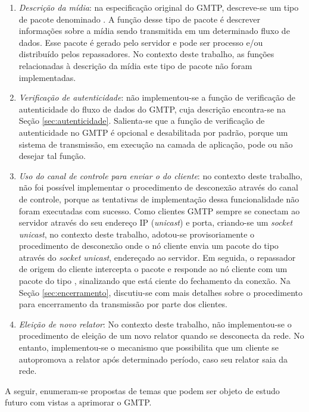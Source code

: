 \begin{enumerate}
\item \textit{Descrição da mídia}: na especificação original do GMTP, descreve-se um tipo de pacote denominado . A função desse tipo de pacote é descrever informações sobre a mídia sendo transmitida em um determinado fluxo de dados. Esse pacote é gerado pelo servidor e pode ser processo e/ou distribuído pelos repassadores.
No contexto deste trabalho, as funções relacionadas à descrição da mídia este tipo de pacote não foram implementadas. 

\item \textit{Verificação de autenticidade}: 
não implementou-se a função de verificação de autenticidade do fluxo de dados do GMTP, cuja descrição encontra-se na Seção \ref{sec:autenticidade}. 
Salienta-se que a função de verificação de autenticidade no GMTP é opcional e desabilitada por padrão, porque um sistema de transmissão, em execução na camada de aplicação, pode ou não desejar tal função.

\item \textit{Uso do canal de controle para enviar o  do cliente}:
no contexto deste trabalho, não foi possível implementar o procedimento de desconexão através do canal de controle, porque as tentativas de implementação dessa funcionalidade não foram executadas com sucesso.
Como clientes GMTP sempre se conectam ao servidor através do seu endereço IP (\textit{unicast}) e porta, criando-se um \textit{socket unicast}, no contexto deste trabalho, adotou-se provisoriamente o procedimento de desconexão onde o nó cliente envia um pacote do tipo  através do \textit{socket unicast}, endereçado ao servidor. Em seguida, o repassador de origem do cliente intercepta o pacote e responde ao nó cliente com um pacote do tipo , sinalizando que está ciente do fechamento da conexão.
Na Seção \ref{sec:encerramento}, discutiu-se com mais detalhes sobre o procedimento para encerramento da transmissão por parte dos clientes.

\item \textit{Eleição de novo relator}:
No contexto deste trabalho, não implementou-se o procedimento de eleição de um novo relator quando se desconecta da rede. No entanto, implementou-se o mecanismo que possibilita que um cliente se autopromova a relator após determinado período, caso seu relator saia da rede. 
\end{enumerate}

A seguir, enumeram-se propostas de temas que podem ser objeto de estudo futuro com vistas a aprimorar o GMTP.

